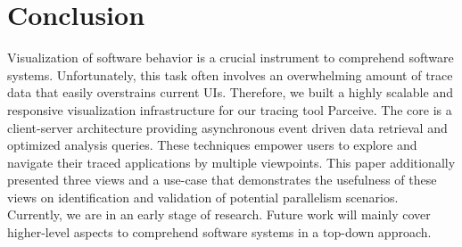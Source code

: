 \section{Conclusion}
\label{sec:conclusion}
Visualization of software behavior is a crucial instrument to comprehend
software systems. Unfortunately, this task often involves an overwhelming
amount of trace data that easily overstrains current UIs. Therefore, we built a
highly scalable and responsive visualization infrastructure for our tracing
tool Parceive. The core is a client-server architecture providing asynchronous
event driven data retrieval and optimized analysis queries. These techniques
empower users to explore and navigate their traced applications by multiple
viewpoints. This paper additionally presented three views and a use-case that
demonstrates the usefulness of these views on identification and validation of
potential parallelism scenarios. Currently, we are in an early stage of
research. Future work will mainly cover higher-level aspects to comprehend
software systems in a top-down approach.